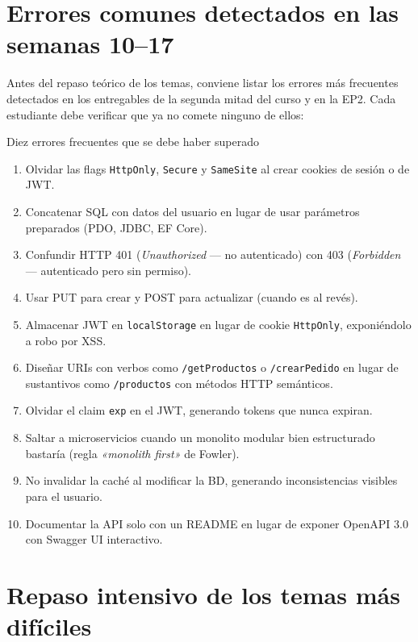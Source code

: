 \documentclass[11pt,a4paper,openany]{book}
\begin{document}
\section{Errores comunes detectados en las semanas 10--17}

Antes del repaso teórico de los temas, conviene listar los errores
más frecuentes detectados en los entregables de la segunda mitad del
curso y en la EP2. Cada estudiante debe verificar que ya no comete
ninguno de ellos:

\begin{cajaadvertencia}{Diez errores frecuentes que se debe haber superado}
\begin{enumerate}
\item Olvidar las flags \texttt{HttpOnly}, \texttt{Secure} y
\texttt{SameSite} al crear cookies de sesión o de JWT.
\item Concatenar SQL con datos del usuario en lugar de usar parámetros
preparados (PDO, JDBC, EF Core).
\item Confundir HTTP 401 (\emph{Unauthorized} --- no autenticado) con
403 (\emph{Forbidden} --- autenticado pero sin permiso).
\item Usar PUT para crear y POST para actualizar (cuando es al revés).
\item Almacenar JWT en \texttt{localStorage} en lugar de cookie
\texttt{HttpOnly}, exponiéndolo a robo por XSS.
\item Diseñar URIs con verbos como \texttt{/getProductos} o
\texttt{/crearPedido} en lugar de sustantivos como \texttt{/productos}
con métodos HTTP semánticos.
\item Olvidar el claim \texttt{exp} en el JWT, generando tokens que
nunca expiran.
\item Saltar a microservicios cuando un monolito modular bien
estructurado bastaría (regla \emph{«monolith first»} de Fowler).
\item No invalidar la caché al modificar la BD, generando
inconsistencias visibles para el usuario.
\item Documentar la API solo con un README en lugar de exponer
OpenAPI 3.0 con Swagger UI interactivo.
\end{enumerate}
\end{cajaadvertencia}

\section{Repaso intensivo de los temas más difíciles}
\end{document}
